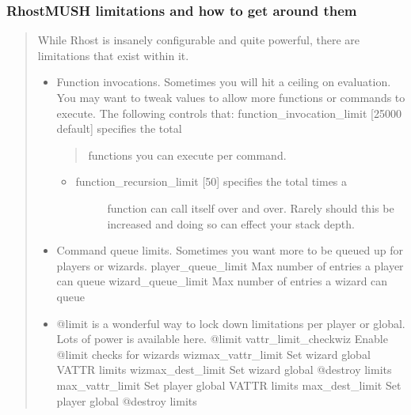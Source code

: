 \documentclass[letterpaper,10pt,english]{sphinxmanual}
\begin{document}
\subsubsection{RhostMUSH limitations and how to get around them}
\label{\detokenize{features:rhostmush-limitations-and-how-to-get-around-them}}\begin{quote}

\sphinxAtStartPar
While Rhost is insanely configurable and quite powerful, there are
limitations that exist within it.
\begin{itemize}
\item {} 
\sphinxAtStartPar
Function invocations.  Sometimes you will hit a ceiling on evaluation.
You may want to tweak values to allow more functions or commands
to execute.  The following controls that:
\sphinxhyphen{} function\_invocation\_limit {[}25000 default{]} \sphinxhyphen{} specifies the total
\begin{quote}

\sphinxAtStartPar
functions you can execute per command.
\end{quote}
\begin{itemize}
\item {} \begin{description}
\item[{function\_recursion\_limit {[}50{]} \sphinxhyphen{} specifies the total times a}] \leavevmode
\sphinxAtStartPar
function can call itself over and over.  Rarely should this
be increased and doing so can effect your stack depth.

\end{description}

\end{itemize}

\item {} 
\sphinxAtStartPar
Command queue limits.  Sometimes you want more to be queued up for
players or wizards.
\sphinxhyphen{} player\_queue\_limit  \sphinxhyphen{} Max number of entries a player can queue
\sphinxhyphen{} wizard\_queue\_limit  \sphinxhyphen{} Max number of entries a wizard can queue

\item {} 
\sphinxAtStartPar
@limit is a wonderful way to lock down limitations per player or
global.  Lots of power is available here.
\sphinxhyphen{} @limit
\sphinxhyphen{} vattr\_limit\_checkwiz \sphinxhyphen{} Enable @limit checks for wizards
\sphinxhyphen{} wizmax\_vattr\_limit   \sphinxhyphen{} Set wizard global VATTR limits
\sphinxhyphen{} wizmax\_dest\_limit    \sphinxhyphen{} Set wizard global @destroy limits
\sphinxhyphen{} max\_vattr\_limit      \sphinxhyphen{} Set player global VATTR limits
\sphinxhyphen{} max\_dest\_limit       \sphinxhyphen{} Set player global @destroy limits


\end{itemize}
\end{quote}
\end{document}
